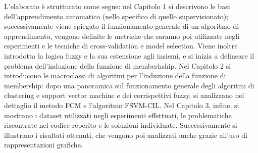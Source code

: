 \documentclass[oneside, openany]{book}
\begin{document}
	L'elaborato è strutturato come segue: nel Capitolo 1 si descrivono le basi dell'apprendimento automatico (nello specifico di quello supervisionato); successivamente viene spiegato il funzionamento generale di un algoritmo di apprendimento, vengono definite le metriche che saranno poi utilizzate negli esperimenti e le tecniche di cross-validation e model selection. Viene inoltre introdotta la logica fuzzy e la sua estensione agli insiemi, e si inizia a delineare il problema dell'induzione della funzione di memberhship. Nel Capitolo 2 si introducono le macroclassi di algoritmi per l'induzione della funzione di membership: dopo una panoramica sul funzionamento generale degli algoritmi di clustering e support vector machine e dei corrispettivi fuzzy, si analizzano nel dettaglio il metodo FCM e l'algoritmo FSVM-CIL. Nel Capitolo 3, infine, si mostrano i dataset utilizzati negli esperimenti effettuati, le problematiche riscontrate nel codice reperito e le soluzioni individuate. Successivamente si illustrano i risultati ottenuti, che vengono poi analizzati anche grazie all'uso di rappresentazioni grafiche.
\end{document}
